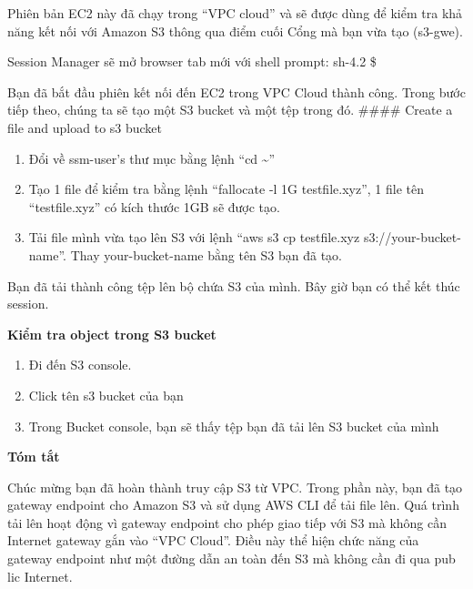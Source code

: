 Phiên bản EC2 này đã chạy trong ``VPC cloud'' và sẽ được dùng để kiểm
tra khả năng kết nối với Amazon S3 thông qua điểm cuối Cổng mà bạn vừa
tạo (s3-gwe).

Session Manager sẽ mở browser tab mới với shell prompt: sh-4.2 \$

Bạn đã bắt đầu phiên kết nối đến EC2 trong VPC Cloud thành công. Trong
bước tiếp theo, chúng ta sẽ tạo một S3 bucket và một tệp trong đó.
\#\#\#\# Create a file and upload to s3 bucket

\begin{enumerate}
\def\labelenumi{\arabic{enumi}.}
\item
  Đổi về ssm-user's thư mục bằng lệnh ``cd \textasciitilde{}''
\item
  Tạo 1 file để kiểm tra bằng lệnh ``fallocate -l 1G testfile.xyz'', 1
  file tên ``testfile.xyz'' có kích thước 1GB sẽ được tạo.
\item
  Tải file mình vừa tạo lên S3 với lệnh ``aws s3 cp testfile.xyz
  s3://your-bucket-name''. Thay your-bucket-name bằng tên S3 bạn đã tạo.
\end{enumerate}

Bạn đã tải thành công tệp lên bộ chứa S3 của mình. Bây giờ bạn có thể
kết thúc session.

\vspace{0.5em}\noindent\textbf{Kiểm tra object trong S3
bucket}\par

\begin{enumerate}
\def\labelenumi{\arabic{enumi}.}
\tightlist
\item
  Đi đến S3 console.\\
\item
  Click tên s3 bucket của bạn
\item
  Trong Bucket console, bạn sẽ thấy tệp bạn đã tải lên S3 bucket của
  mình
\end{enumerate}

\vspace{0.5em}\noindent\textbf{Tóm tắt}\par

Chúc mừng bạn đã hoàn thành truy cập S3 từ VPC. Trong phần này, bạn đã
tạo gateway endpoint cho Amazon S3 và sử dụng AWS CLI để tải file lên.
Quá trình tải lên hoạt động vì gateway endpoint cho phép giao tiếp với
S3 mà không cần Internet gateway gắn vào ``VPC Cloud''. Điều này thể
hiện chức năng của gateway endpoint như một đường dẫn an toàn đến S3 mà
không cần đi qua pub lic Internet.
